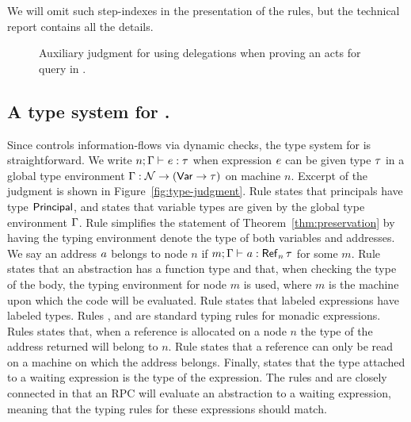 We will omit such step-indexes in the presentation of the rules, but the technical report \cite{techreport} contains all the details.

\begin{figure}
    \centering
    \caption{Auxiliary judgment for using delegations when proving an acts for query in \lang.}
    \label{fig:act-for-judgment-del}
\end{figure}

\subsection{A type system for \lang.}
Since \lang{} controls information-flows via dynamic checks, the type system for \lang{} is straightforward. We write $\hastype{n; \tenv}{\expr}{\type}$ when expression $e$ can be given type $\tau$ in a global type environment $\Gamma: \mathcal{N} \to (\mathsf{Var} \to \tau)$ on machine $n$. Excerpt of the judgment is shown in Figure~\ref{fig:type-judgment}. Rule  states that principals have type $\mathsf{Principal}$, and  states that variable types are given by the global type environment $\Gamma$. Rule  simplifies the statement of Theorem~\ref{thm:preservation} by having the typing environment denote the type of both variables and addresses. We say an address $a$ belongs to node $n$ if $\hastype{m; \tenv}{\addr}{\reftype[n]{\type}}$ for some $m$. Rule  states that an abstraction has a function type and that, when checking the type of the body, the typing environment for node $m$ is used, where $m$ is the machine upon which the code will be evaluated. Rule  states that labeled expressions have labeled types. Rules ,  and  are standard typing rules for monadic expressions. Rules  states that, when a reference is allocated on a node $n$ the type of the address returned will belong to $n$. Rule  states that a reference can only be read on a machine on which the address belongs. Finally,  states that the type attached to a waiting expression is the type of the expression. The rules  and  are closely connected in that an RPC will evaluate an abstraction to a waiting expression, meaning that the typing rules for these expressions should match.

